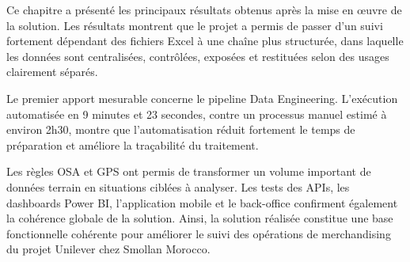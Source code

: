 Ce chapitre a présenté les principaux résultats obtenus après la mise en œuvre de la solution. Les résultats montrent que le projet a permis de passer d’un suivi fortement dépendant des fichiers Excel à une chaîne plus structurée, dans laquelle les données sont centralisées, contrôlées, exposées et restituées selon des usages clairement séparés.

Le premier apport mesurable concerne le pipeline Data Engineering. L’exécution automatisée en 9 minutes et 23 secondes, contre un processus manuel estimé à environ 2h30, montre que l’automatisation réduit fortement le temps de préparation et améliore la traçabilité du traitement.

Les règles OSA et GPS ont permis de transformer un volume important de données terrain en situations ciblées à analyser. Les tests des APIs, les dashboards Power BI, l’application mobile et le back-office confirment également la cohérence globale de la solution. Ainsi, la solution réalisée constitue une base fonctionnelle cohérente pour améliorer le suivi des opérations de merchandising du projet Unilever chez Smollan Morocco.
